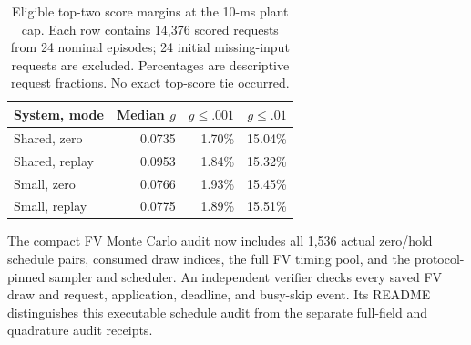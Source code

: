 \begin{table}[tbp]
\centering
\caption{Eligible top-two score margins at the 10-ms plant cap. Each row contains 14,376 scored requests from 24 nominal episodes; 24 initial missing-input requests are excluded. Percentages are descriptive request fractions. No exact top-score tie occurred.}
\label{tab:score_margins}
\fontsize{9.5pt}{11.5pt}\selectfont
\setlength{\tabcolsep}{3pt}
\begin{tabularx}{\linewidth}{@{}Yrrr@{}}
\toprule
System, mode & Median $g$ & $g\le.001$ & $g\le.01$\\
\midrule
Shared, zero & 0.0735 & 1.70\% & 15.04\%\\
Shared, replay & 0.0953 & 1.84\% & 15.32\%\\
Small, zero & 0.0766 & 1.93\% & 15.45\%\\
Small, replay & 0.0775 & 1.89\% & 15.51\%\\
\bottomrule
\end{tabularx}
\end{table}



The compact FV Monte Carlo audit now includes all 1,536 actual zero/hold schedule pairs, consumed draw indices, the full FV timing pool, and the protocol-pinned sampler and scheduler. An independent verifier checks every saved FV draw and request, application, deadline, and busy-skip event. Its README distinguishes this executable schedule audit from the separate full-field and quadrature audit receipts.
